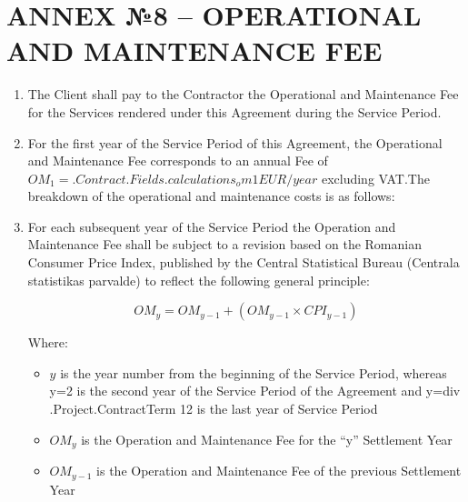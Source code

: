 \section{ANNEX №8 {–} OPERATIONAL AND MAINTENANCE FEE}

\begin{enumerate}[label=\arabic*.]
	\item	The Client shall pay to the Contractor the Operational and Maintenance Fee for the Services rendered under this Agreement during the Service Period.
  \item	For the first year of the Service Period of this Agreement, the Operational and Maintenance Fee corresponds to an annual Fee of $OM_1={{.Contract.Fields.calculations_om1}}EUR/year$ excluding VAT.\@  The breakdown of the operational and maintenance costs is as follows:


\begin{center}
\end{center}

	\item For each subsequent year of the Service Period the Operation and Maintenance Fee shall be subject to a revision based on the Romanian Consumer Price Index, published by the Central Statistical Bureau (Centrala statistikas parvalde) to reflect the following general principle:

\[ OM_y = OM_{y-1} + (OM_{y-1} \times CPI_{y-1}) \]

Where:
\begin{itemize}
	\item $y$ is the year number from the beginning of the Service Period, whereas y=2 is the second year of the Service Period of the Agreement and y={{div .Project.ContractTerm 12}} is the last year of Service Period %
	\item $OM_y$ is the Operation and Maintenance Fee for the “y” Settlement Year
	\item $OM_{y-1}$ is the Operation and Maintenance Fee of the previous Settlement Year
\end{itemize}


\end{enumerate}
